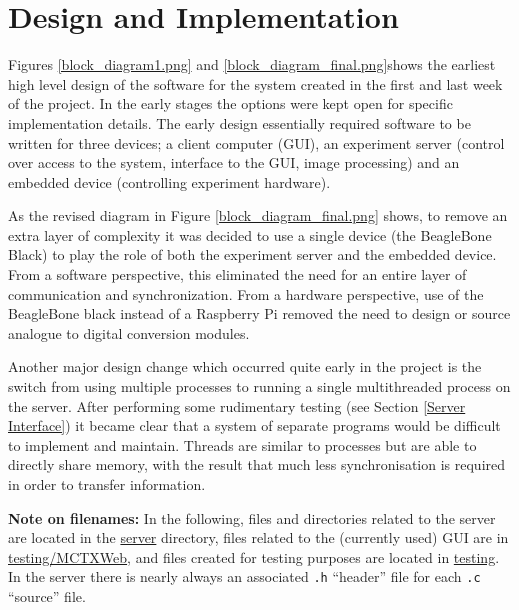 \chapter{Design and Implementation}\label{Design and Implementation}


Figures \ref{block_diagram1.png} and \ref{block_diagram_final.png}shows the earliest high level design of the software for the system created in the first and last week of the project. In the early stages the options were kept open for specific implementation details. The early design essentially required software to be written for three devices; a client computer (GUI), an experiment server (control over access to the system, interface to the GUI, image processing) and an embedded device (controlling experiment hardware). 


As the revised diagram in Figure \ref{block_diagram_final.png} shows, to remove an extra layer of complexity it was decided to use a single device (the BeagleBone Black) to play the role of both the experiment server and the embedded device. From a software perspective, this eliminated the need for an entire layer of communication and synchronization. From a hardware perspective, use of the BeagleBone black instead of a Raspberry Pi removed the need to design or source analogue to digital conversion modules.

Another major design change which occurred quite early in the project is the switch from using multiple processes to running a single multithreaded process on the server. After performing some rudimentary testing (see Section \ref{Server Interface}) it became clear that a system of separate programs would be difficult to implement and maintain. Threads are similar to processes but are able to directly share memory, with the result that much less synchronisation is required in order to transfer information.

{\bf Note on filenames:} In the following, files and directories related to the server are located in the \href{https://github.com/szmoore/MCTX3420/tree/master/server}{server} directory, files related to the (currently used) GUI are in \href{https://github.com/szmoore/MCTX3420/tree/master/testing/MCTXWeb}{testing/MCTXWeb}, and files created for testing purposes are located in \href{https://github.com/szmoore/MCTX3420/tree/master/testing}{testing}. In the server there is nearly always an associated \texttt{.h} ``header'' file for each \texttt{.c} ``source'' file.

